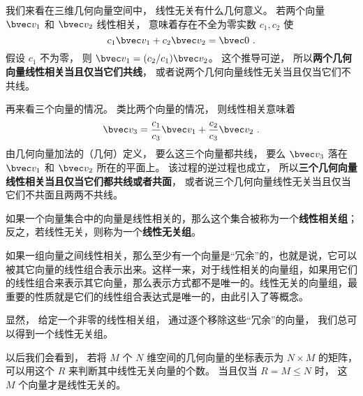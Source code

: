 \begin{example}{ }\label{ex_linDpe_1}
我们来看在三维几何向量空间中， 线性无关有什么几何意义。 若两个向量 $\bvec v_1$ 和 $\bvec v_2$ 线性相关， 意味着存在不全为零实数 $c_1, c_2$ 使
\begin{equation}
c_1 \bvec v_1 + c_2 \bvec v_2 = \bvec 0~.
\end{equation}
假设 $c_1$ 不为零， 则 $\bvec v_1 = (c_2 / c_1) \bvec v_2$。 这个推导可逆， 所以\textbf{两个几何向量线性相关当且仅当它们共线}， 或者说两个几何向量线性无关当且仅当它们不共线。

再来看三个向量的情况。 类比两个向量的情况， 则线性相关意味着
\begin{equation}
\bvec v_3 = \frac{c_1}{c_3} \bvec v_1 +  \frac{c_2}{c_3} \bvec v_2~.
\end{equation}
由几何向量加法的（几何）定义， 要么这三个向量都共线， 要么 $\bvec v_3$ 落在 $\bvec v_1$ 和 $\bvec v_2$ 所在的平面上。 该过程的逆过程也成立， 所以\textbf{三个几何向量线性相关当且仅当它们都共线或者共面}， 或者说三个几何向量线性无关当且仅当它们不共面且两两不共线。
\end{example}

如果一个向量集合中的向量是线性相关的，那么这个集合被称为一个\textbf{线性相关组}；反之，若线性无关，则称为一个\textbf{线性无关组}。

如果一组向量之间线性相关，那么至少有一个向量是“冗余”的，也就是说，它可以被其它向量的线性组合表示出来。这样一来，对于线性相关的向量组，如果用它们的线性组合来表示其它向量，那么表示方式都不是唯一的。线性无关的向量组，最重要的性质就是它们的线性组合表达式是唯一的，由此引入了等概念。

显然， 给定一个非零的线性相关组， 通过逐个移除这些“冗余”的向量， 我们总可以得到一个线性无关组。

以后我们会看到， 若将 $M$ 个 $N$ 维空间的几何向量的坐标表示为 $N\times M$ 的矩阵， 可以用这个 $R$ 来判断其中线性无关向量的个数。 当且仅当 $R = M \leqslant N$ 时， 这 $M$ 个向量才是线性无关的。

